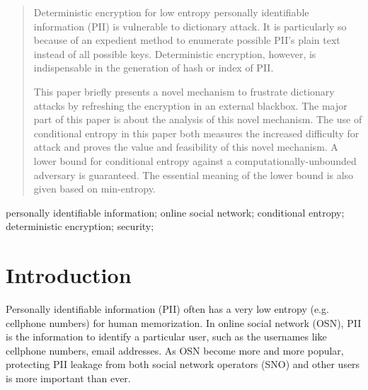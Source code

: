 \documentclass[10pt, conference, compsocconf]{IEEEtran}
\begin{document}




\maketitle


\begin{abstract}
	Deterministic encryption for low entropy personally identifiable information
	(PII) is vulnerable 
	to dictionary attack. It is particularly so because 
	of an expedient method to enumerate possible PII's 
	plain text instead of all possible keys.
	Deterministic encryption, however, 
	is indispensable in the generation of hash or index of PII.
	
	This paper briefly presents a novel mechanism
	to frustrate dictionary attacks
	by refreshing the encryption in an external blackbox.	
	The major part of this paper is about the analysis
	of this novel mechanism.
	The use of conditional entropy in this paper both measures the increased
	difficulty for attack and proves the value and feasibility
	of this novel mechanism.
	A lower bound for conditional entropy
	against a computationally-unbounded adversary is guaranteed.
	The essential meaning of the lower bound is also
	given based on min-entropy.
	
\end{abstract}

\begin{IEEEkeywords}
personally identifiable information; online social network; conditional entropy; deterministic encryption;
security;

\end{IEEEkeywords}


%
\IEEEpeerreviewmaketitle



\section{Introduction}
	Personally identifiable information (PII) often has
	a very low entropy (e.g. cellphone numbers) for human memorization.
	In online social network (OSN), PII is the information
	to identify a particular user, such as the usernames like cellphone numbers,
	email addresses.	
	As OSN become more and more popular,
	protecting PII leakage from both social network operators (SNO)
	and other users is more important than ever.
\end{document}
